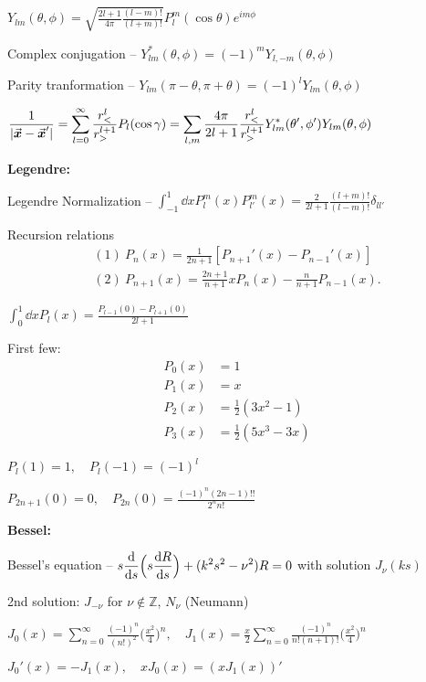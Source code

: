 $\displaystyle Y_{lm}(\theta,\phi) = \sqrt{\frac{2l+1}{4\pi} \frac{(l-m)!}{(l+m)!}} P_{l}^{m}(\cos{\theta}) e^{im\phi}$

Complex conjugation -- $Y_{lm}^{*}(\theta,\phi) = (-1)^{m} Y_{l,-m}(\theta,\phi)$

Parity tranformation -- $Y_{lm}(\pi - \theta,\pi + \theta) = (-1)^{l} Y_{lm}(\theta,\phi)$

$\displaystyle \frac{1}{|\va*{x} - \va*{x}'|} = \sum_{l=0}^{\infty} \frac{r_{<}^{l}}{r_{>}^{l+1}} P_{l}(\cos{\gamma}) = \sum_{l,m} \frac{4\pi}{2l+1} \frac{r_{<}^{l}}{r_{>}^{l+1}} Y_{lm}^{*}(\theta',\phi') Y_{lm}(\theta,\phi)$

\textbf{Legendre:}

Legendre Normalization -- $\displaystyle \int_{-1}^{1} \dd{x} P_{l}^{m}(x) P_{l'}^{m}(x) = \frac{2}{2l+1} \frac{(l+m)!}{(l-m)!} \delta_{ll'}$

Recursion relations
\begin{gather}
    (1)~P_{n}(x) = \frac{1}{2n+1} [ P_{n+1}'(x) - P_{n-1}'(x) ] \\
    (2)~P_{n+1}(x) = \frac{2n+1}{n+1} xP_{n}(x) - \frac{n}{n+1}P_{n-1}(x)
.\end{gather}

$\displaystyle \int_{0}^{1} \dd{x} P_{l}(x) = \frac{P_{l-1}(0) - P_{l+1}(0)}{2l+1}$

First few:
\begin{align}
    P_0(x) &= 1 \\
    P_1(x) &= x \\
    P_2(x) &= \frac{1}{2} ( 3x^2 - 1 ) \\
    P_3(x) &= \frac{1}{2} ( 5x^3 - 3x )
\end{align}

$P_{l}(1) = 1, \quad P_{l}(-1) = (-1)^{l}$

$\displaystyle P_{2n+1}(0) = 0,\quad P_{2n}(0) = \frac{(-1)^{n} (2n-1)!!}{2^{n} n!}$

\textbf{Bessel:}

Bessel's equation -- $\displaystyle s \dv{s} \Big( s \dv{R}{s} \Big) + (k^2s^2 - \nu^2) R = 0$ with solution $J_{\nu}(ks)$

2nd solution: $J_{-\nu}$ for $\nu \not\in \mathbb{Z}$, $N_{\nu}$ (Neumann)

$\displaystyle J_0(x) = \sum_{n=0}^{\infty} \frac{(-1)^{n}}{(n!)^2} \Big( \frac{x^2}{4} \Big)^{n}, \quad J_1(x) = \frac{x}{2} \sum_{n=0}^{\infty} \frac{(-1)^{n}}{n!(n+1)!} \Big( \frac{x^2}{4} \Big)^{n}$

$J_0'(x) = -J_1(x), \quad x J_0(x) = (x J_1(x))'$


